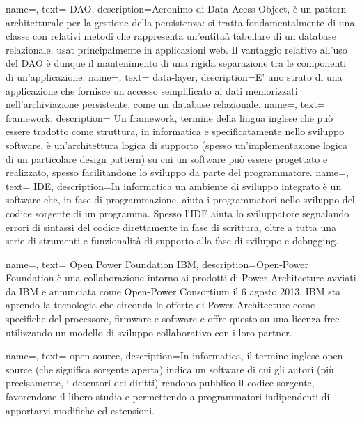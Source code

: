 {
    name=,
    text= DAO,
    description={Acronimo di Data Acess Object, è un pattern architetturale per la gestione della persistenza: si tratta fondamentalmente di una classe con relativi metodi che rappresenta un'entitaà tabellare di un database relazionale, usat principalmente in applicazioni web. Il vantaggio relativo all'uso del DAO è dunque il mantenimento di una rigida separazione tra le componenti di un'applicazione.}
}
{
    name=,
    text= data-layer,
    description={E' uno strato di una applicazione che fornisce un accesso semplificato ai dati memorizzati nell'archiviazione persistente, come un database relazionale.}
}
{
    name=,
    text= framework,
    description={ Un framework, termine della lingua inglese che può essere tradotto come struttura, in informatica e specificatamente nello sviluppo software, è un'architettura logica di supporto (spesso un'implementazione logica di un particolare design pattern) su cui un software può essere progettato e realizzato, spesso facilitandone lo sviluppo da parte del programmatore.}
}
{
    name=,
    text= IDE,
    description={In informatica un ambiente di sviluppo integrato è un software che, in fase di programmazione, aiuta i programmatori nello sviluppo del codice sorgente di un programma. Spesso l'IDE aiuta lo sviluppatore segnalando errori di sintassi del codice direttamente in fase di scrittura, oltre a tutta una serie di strumenti e funzionalità di supporto alla fase di sviluppo e debugging.}
}

{
    name=,
    text= Open Power Foundation IBM,
    description={Open-Power Foundation è una collaborazione intorno ai prodotti di Power Architecture avviati da IBM e annunciata come Open-Power Consortium il 6 agosto 2013. IBM sta aprendo la tecnologia che circonda le offerte di Power Architecture come specifiche del processore, firmware e software e offre questo su una licenza free utilizzando un modello di sviluppo collaborativo con i loro partner.}
}




{
    name=,
    text= open source,
    description={In informatica, il termine inglese open source (che significa sorgente aperta) indica un software di cui gli autori (più precisamente, i detentori dei diritti) rendono pubblico il codice sorgente, favorendone il libero studio e permettendo a programmatori indipendenti di apportarvi modifiche ed estensioni.}
}

